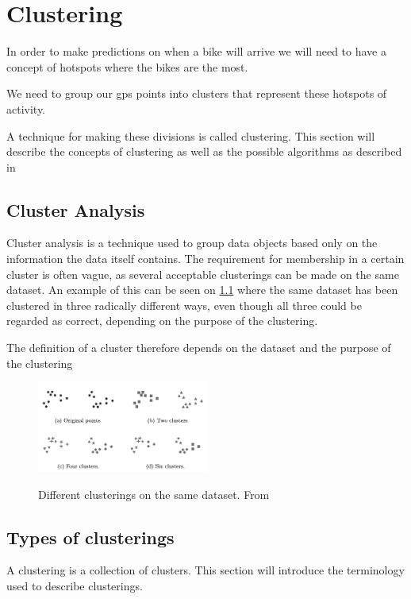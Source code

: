 \chapter{Clustering}

In order to make predictions on when a bike will arrive we will need to have a concept of hotspots where the bikes are the most.

We need to group our gps points into clusters that represent these hotspots of activity.

A technique for making these divisions is called clustering.
This section will describe the concepts of clustering as well as the possible algorithms as described in \citet{pang2006introduction}

\section{Cluster Analysis}
Cluster analysis is a technique used to group data objects based only on the information the data itself contains.
The requirement for membership in a certain cluster is often vague, as several acceptable clusterings can be made on the same dataset.
An example of this can be seen on \cref{clusterings} where the same dataset has been clustered in three radically different ways, even though all three could be regarded as correct, depending on the purpose of the clustering.

The definition of a cluster therefore depends on the dataset and the purpose of the clustering 

\begin{figure}[H]
\includegraphics[width=0.5\textwidth]{graphics/clusterings}
\label{clusterings}
\caption{Different clusterings on the same dataset. From \citet{pang2006introduction}}
\end{figure}

\section{Types of clusterings}

A clustering is a collection of clusters.
This section will introduce the terminology used to describe clusterings. 

